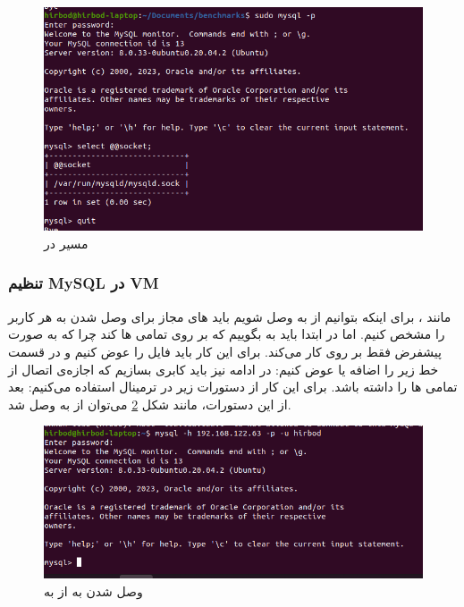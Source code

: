 \begin{figure}[H]
    \centering
    \includegraphics[scale=0.5]{pictures/mysql/baremetal/socket-path.png}
    \caption{مسیر  در }
    \label{fig:mysql:init:unixsocket}
\end{figure}
\subsubsection{تنظیم MySQL در VM}
مانند
،
برای اینکه بتوانیم از
به
وصل شویم باید
های
مجاز برای وصل شدن به هر کاربر را مشخص کنیم. اما در ابتدا باید به
بگوییم که بر روی تمامی
ها 
کند چرا که به صورت پیشفرض فقط بر روی
کار می‌کند. برای این کار باید فایل
را عوض کنیم و در قسمت
\codeword{[mysqld]}
خط زیر را اضافه یا عوض کنیم:
در ادامه نیز باید کابری بسازیم که اجازه‌ی اتصال از تمامی
ها را داشته باشد.
برای این کار از دستورات زیر در ترمینال
استفاده می‌کنیم:
بعد از این دستورات، مانند شکل
\ref{fig:mysql:init:host_to_vm}
می‌توان از
 به 
وصل شد.
\begin{figure}[H]
    \centering
    \includegraphics[scale=0.5]{pictures/mysql/vm/connection.png}
    \caption{وصل شدن به  از  به }
    \label{fig:mysql:init:host_to_vm}
\end{figure}
